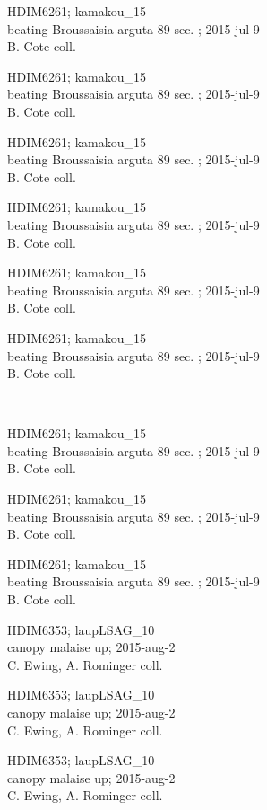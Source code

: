 \documentclass[2pt]{extarticle}
\begin{document}
\noindent
\parbox{0.16\textwidth}{\tiny \raggedright \rule[-0.3\baselineskip]{0pt}{10pt}HDIM6261; kamakou\_15\\ beating Broussaisia arguta 89 sec. ; 2015-jul-9\\ B. Cote coll.}
\parbox{0.16\textwidth}{\tiny \raggedright \rule[-0.3\baselineskip]{0pt}{10pt}HDIM6261; kamakou\_15\\ beating Broussaisia arguta 89 sec. ; 2015-jul-9\\ B. Cote coll.}
\parbox{0.16\textwidth}{\tiny \raggedright \rule[-0.3\baselineskip]{0pt}{10pt}HDIM6261; kamakou\_15\\ beating Broussaisia arguta 89 sec. ; 2015-jul-9\\ B. Cote coll.}
\parbox{0.16\textwidth}{\tiny \raggedright \rule[-0.3\baselineskip]{0pt}{10pt}HDIM6261; kamakou\_15\\ beating Broussaisia arguta 89 sec. ; 2015-jul-9\\ B. Cote coll.}
\parbox{0.16\textwidth}{\tiny \raggedright \rule[-0.3\baselineskip]{0pt}{10pt}HDIM6261; kamakou\_15\\ beating Broussaisia arguta 89 sec. ; 2015-jul-9\\ B. Cote coll.}
\parbox{0.16\textwidth}{\tiny \raggedright \rule[-0.3\baselineskip]{0pt}{10pt}HDIM6261; kamakou\_15\\ beating Broussaisia arguta 89 sec. ; 2015-jul-9\\ B. Cote coll.} \\ 
\vspace{0.001in} 

\noindent
\parbox{0.16\textwidth}{\tiny \raggedright \rule[-0.3\baselineskip]{0pt}{10pt}HDIM6261; kamakou\_15\\ beating Broussaisia arguta 89 sec. ; 2015-jul-9\\ B. Cote coll.}
\parbox{0.16\textwidth}{\tiny \raggedright \rule[-0.3\baselineskip]{0pt}{10pt}HDIM6261; kamakou\_15\\ beating Broussaisia arguta 89 sec. ; 2015-jul-9\\ B. Cote coll.}
\parbox{0.16\textwidth}{\tiny \raggedright \rule[-0.3\baselineskip]{0pt}{10pt}HDIM6261; kamakou\_15\\ beating Broussaisia arguta 89 sec. ; 2015-jul-9\\ B. Cote coll.}
\parbox{0.16\textwidth}{\tiny \raggedright \rule[-0.3\baselineskip]{0pt}{10pt}HDIM6353; laupLSAG\_10\\ canopy malaise up; 2015-aug-2\\ C. Ewing, A. Rominger coll.}
\parbox{0.16\textwidth}{\tiny \raggedright \rule[-0.3\baselineskip]{0pt}{10pt}HDIM6353; laupLSAG\_10\\ canopy malaise up; 2015-aug-2\\ C. Ewing, A. Rominger coll.}
\parbox{0.16\textwidth}{\tiny \raggedright \rule[-0.3\baselineskip]{0pt}{10pt}HDIM6353; laupLSAG\_10\\ canopy malaise up; 2015-aug-2\\ C. Ewing, A. Rominger coll.} \\ 
\vspace{0.001in} 
\end{document}
